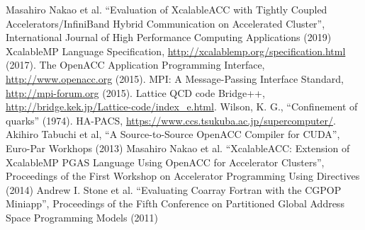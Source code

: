 \documentclass[graybox]{svmult}
\def\XMP{XcalableMP}
\def\XMP{XMP}
\begin{document}



\begin{thebibliography}{99}
 Masahiro Nakao et al.
 ``Evaluation of XcalableACC with Tightly Coupled Accelerators/InfiniBand Hybrid Communication on Accelerated Cluster'', International Journal of High Performance Computing Applications (2019)
  XcalableMP Language Specification, \url{http://xcalablemp.org/specification.html} (2017).
  The OpenACC Application Programming Interface, \url{http://www.openacc.org} (2015).
  MPI: A Message-Passing Interface Standard, \url{http://mpi-forum.org} (2015).
  Lattice QCD code Bridge++, \url{http://bridge.kek.jp/Lattice-code/index\_e.html}.
  Wilson, K. G., ``Confinement of quarks'' (1974).
  HA-PACS, \url{https://www.ccs.tsukuba.ac.jp/supercomputer/}.
  Akihiro Tabuchi et al, ``A Source-to-Source OpenACC Compiler for CUDA'', Euro-Par Workhops (2013)
  Masahiro Nakao et al. ``XcalableACC: Extension of XcalableMP PGAS Language Using OpenACC for Accelerator Clusters'',
   Proceedings of the First Workshop on Accelerator Programming Using Directives (2014)
  Andrew I. Stone et al. ``Evaluating Coarray Fortran with the CGPOP Miniapp'',
   Proceedings of the Fifth Conference on Partitioned Global Address Space Programming Models (2011)
\end{thebibliography}
\end{document}
